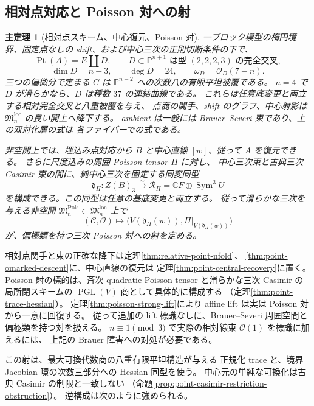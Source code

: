\documentclass[11pt,a4paper]{ltjsarticle}
\numberwithin{equation}{section}
\newtheorem{maintheorem}{主定理}
\newcommand{\C}{\mathbb C}
\newcommand{\PP}{\mathbb P}
\newcommand{\OO}{\mathcal O}
\newcommand{\Sym}{\operatorname{Sym}}
\newcommand{\PGL}{\operatorname{PGL}}
\begin{document}
\subsection{相対点対応と Poisson 対への射}
\begin{maintheorem}[相対点スキーム、中心復元、Poisson 対]
一ブロック模型の楕円境界、固定点なしの shift、および中心三次の正則切断条件の下で、
\[
 \operatorname{Pt}(A)=E\amalg D,\qquad
 D\subset\PP^{n+1}\text{ は型 }(2,2,2,3)\text{ の完全交叉},
\]
\[
 \dim D=n-3,\qquad\deg D=24,\qquad\omega_D=\OO_D(7-n).
\]
三つの偏微分で定まる $C$ は $\PP^{n-2}$ への次数八の有限平坦被覆である。
$n=4$ で $D$ が滑らかなら、$D$ は種数 $37$ の連結曲線である。
これらは任意底変更と両立する相対完全交叉と八重被覆を与え、
点商の関手、shift のグラフ、中心射影は
$\mathfrak M_n^{\mathrm{loc}}$ の良い開上へ降下する。
ambient は一般には Brauer--Severi 束であり、上の双対化層の式は
各ファイバーでの式である。

非空開上では、埋込み点対応から $B$ と中心直線 $[w]$、従って $A$ を復元できる。
さらに尺度込みの周囲 Poisson tensor $\Pi$ に対し、
中心三次束と古典三次 Casimir 束の間に、純中心三次を固定する同変同型
\[
 \mathfrak d_\Pi:Z(B)_3\xrightarrow{\sim}
 \mathcal R_\Pi=\C F\oplus\Sym^3U
\]
を構成できる。この同型は任意の基底変更と両立する。
従って滑らかな三次を与える非空開
$\mathfrak M_n^{\mathrm{Pois}}\subset\mathfrak M_n^{\mathrm{loc}}$ 上で
\[
 (\mathcal C,\mathcal O)\longmapsto
 \bigl(V(\mathfrak d_\Pi(w)),\Pi|_{V(\mathfrak d_\Pi(w))}\bigr)
\]
が、偏極類を持つ三次 Poisson 対への射を定める。
\end{maintheorem}

相対点関手と束の正確な降下は定理\ref{thm:relative-point-nfold}、
\ref{thm:point-omarked-descent}に、中心直線の復元は
定理\ref{thm:point-central-recovery}に置く。
Poisson 射の標的は、斉次 quadratic Poisson tensor と滑らかな三次 Casimir の
局所閉スキームの $\PGL(V)$ 商として具体的に構成する
（定理\ref{thm:point-trace-hessian}）。
定理\ref{thm:poisson-strong-lift}により affine lift は実は Poisson 対から一意に回復する。
従って追加の lift 標識なしに、Brauer--Severi 周囲空間と偏極類を持つ対を扱える。
$n\equiv1\pmod3$ で実際の相対線束 $\OO(1)$ を標識に加えるには、
上記の Brauer 障害への対処が必要である。

この射は、最大可換代数商の八重有限平坦構造が与える
正規化 trace と、境界 Jacobian 環の次数三部分への Hessian 同型を使う。
中心元の単純な可換化は古典 Casimir の制限と一致しない
（命題\ref{prop:point-casimir-restriction-obstruction}）。
逆構成は次のように強められる。
\end{document}
